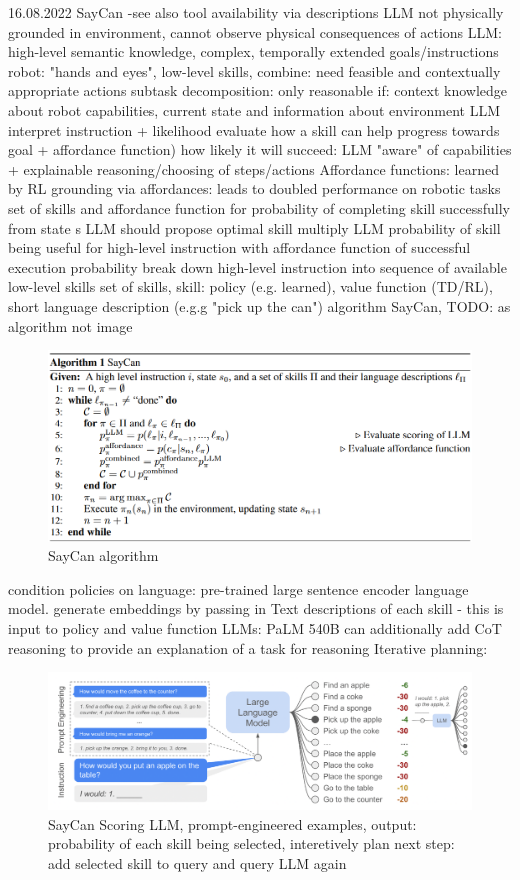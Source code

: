 \documentclass{article}
\begin{document}
\cite{ahn_as_2022} 16.08.2022 SayCan -see also tool availability via descriptions
LLM not physically grounded in environment, cannot observe physical consequences of actions
LLM: high-level semantic knowledge, complex, temporally extended goals/instructions
robot: "hands and eyes", low-level skills, 
combine: need feasible and contextually appropriate actions
subtask decomposition: only reasonable if: context knowledge about robot capabilities, current state and information about environment
LLM interpret instruction + likelihood evaluate how a skill can help progress towards goal + affordance function) how likely it will succeed: LLM "aware" of capabilities + explainable reasoning/choosing of steps/actions
Affordance functions: learned by RL
grounding via affordances: leads to doubled performance on robotic tasks
set of skills and affordance function for probability of completing skill successfully from state s
LLM should propose optimal skill
multiply LLM probability of skill being useful for high-level instruction with affordance function of successful execution probability
break down high-level instruction into sequence of available low-level skills
set of skills, skill: policy (e.g. learned), value function (TD/RL), short language description (e.g.g "pick up the can")
algorithm SayCan, TODO: as algorithm not image 
\begin{figure}[h]
	\centering
	\includegraphics[width=0.8\linewidth]{SayCanAlgorithm}
	\caption{SayCan algorithm \cite{ahn_as_2022}}
	\label{fig:saycanalgorithm}
\end{figure}
condition policies on language: pre-trained large sentence encoder language model. generate embeddings by passing in Text descriptions of each skill -  this is input to policy and value function
LLMs: PaLM 540B
can additionally add CoT reasoning to provide an explanation of a task for reasoning
Iterative planning:
\begin{figure}[h]
	\centering
	\includegraphics[width=0.85\linewidth]{SayCanScoringLLM.png}
	\caption{SayCan Scoring LLM, prompt-engineered examples, output: probability of each skill being selected, interetively plan next step: add selected skill to query and query LLM again \cite{ahn_as_2022}}
	\label{fig:saycanscoringLLM}
\end{figure}
\end{document}
